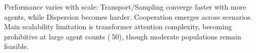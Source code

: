 \begin{replybox}
Performance varies with scale: Transport/Sampling converge faster with more agents, while Dispersion becomes harder. Cooperation emerges across scenarios. Main scalability limitation is transformer attention complexity, becoming prohibitive at large agent counts ($~$50), though moderate populations remain feasible.
\end{replybox}